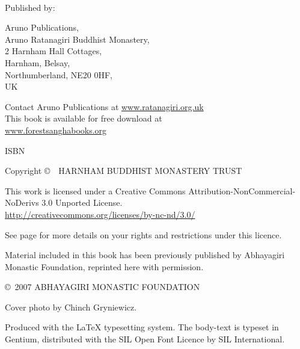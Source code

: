 \enlargethispage{2\baselineskip}
{\small\setlength{\parskip}{0.7em}\setlength{\parindent}{0em}%
{\raggedright%

\thetitle\\
\theauthor

Published by:

Aruno Publications,\\
Aruno Ratanagiri Buddhist Monastery,\\
2 Harnham Hall Cottages,\\
Harnham, Belsay,\\
Northumberland, NE20 0HF,\\
UK

Contact Aruno Publications at \href{http://ratanagiri.org.uk}{www.ratanagiri.org.uk}\\
This book is available for free download at\\
\href{http://forestsanghabooks.org/}{www.forestsanghabooks.org}

ISBN \theISBN

Copyright \copyright\ \the\year\ HARNHAM BUDDHIST MONASTERY TRUST

\vfill

{\footnotesize

This work is licensed under a Creative Commons Attribution-NonCommercial-NoDerivs 3.0 Unported License.\\
\href{http://creativecommons.org/licenses/by-nc-nd/3.0/}{http://creativecommons.org/licenses/by-nc-nd/3.0/}

See page \pageref{copyright-details} for more details on your rights and restrictions under this licence.

Material included in this book has been previously published by Abhayagiri Monastic Foundation, reprinted here with permission.

\copyright\ 2007 ABHAYAGIRI MONASTIC FOUNDATION

Cover photo by Chinch Gryniewicz.

Produced with the {\selectfont\LaTeX} typesetting system. The body-text is typeset in Gentium, distributed with the SIL Open Font Licence by SIL International.

\theEditionInfo

\thePrintedByInfo

}

}}

